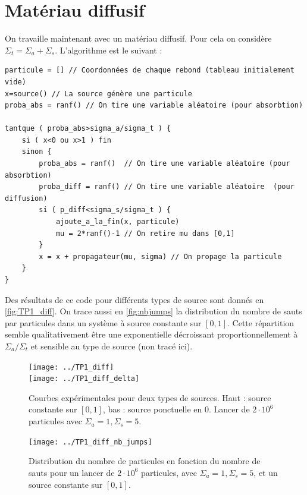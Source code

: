 \documentclass[11pt,a4paper]{article}
\begin{document}
\section{Matériau diffusif}

On travaille maintenant avec un matériau diffusif. Pour cela on considère $\Sigma_t = \Sigma_a + \Sigma_s$. L'algorithme est le suivant : 

\begin{verbatim}
particule = [] // Coordonnées de chaque rebond (tableau initialement vide) 
x=source() // La source génère une particule                                      
proba_abs = ranf() // On tire une variable aléatoire (pour absorbtion)

tantque ( proba_abs>sigma_a/sigma_t ) {
    si ( x<0 ou x>1 ) fin 
    sinon {
        proba_abs = ranf()  // On tire une variable aléatoire (pour absorbtion)
        proba_diff = ranf() // On tire une variable aléatoire  (pour diffusion)
        si ( p_diff<sigma_s/sigma_t ) {
            ajoute_a_la_fin(x, particule)
            mu = 2*ranf()-1 // On retire mu dans [0,1]
        }
        x = x + propagateur(mu, sigma) // On propage la particule
    }
}
\end{verbatim}

Des résultats de ce code pour différents types de source sont donnés en \autoref{fig:TP1_diff}. On trace aussi en \autoref{fig:nbjumps} la distribution du nombre de sauts par particules dans un système à source constante sur $[0,1]$. Cette répartition semble qualitativement être une exponentielle décroissant proportionnellement à $\Sigma_a/\Sigma_t$ et sensible au type de source (non tracé ici).
\begin{figure}
  \centering
  \texttt{[image: ../TP1\_diff]} \\
  \texttt{[image: ../TP1\_diff\_delta]}
  \caption{Courbes expérimentales pour deux types de sources. Haut : source constante sur $[0,1]$, bas : source ponctuelle en 0. Lancer de $2\cdot10^6$ particules avec $\Sigma_a = 1, \Sigma_s = 5$.}
  \label{fig:diff}
\end{figure}

\begin{figure}
  \centering
  \texttt{[image: ../TP1\_diff\_nb\_jumps]}
  \caption{Distribution du nombre de particules en fonction du nombre de sauts pour un lancer de $2\cdot10^6$ particules, avec $\Sigma_a = 1, \Sigma_s = 5$, et un source constante sur $[0,1]$.}
  \label{fig:nbjumps}
\end{figure}
\end{document}

